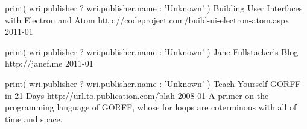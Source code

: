 


\begin{cventries}

  \cventry
    {
    print( wri.publisher ? wri.publisher.name : 'Unknown' )
    } %
    {Building User Interfaces with Electron and Atom} %
    {http://codeproject.com/build-ui-electron-atom.aspx} %
    {2011-01} %
    {} %


  \cventry
    {
    print( wri.publisher ? wri.publisher.name : 'Unknown' )
    } %
    {Jane Fullstacker's Blog} %
    {http://janef.me} %
    {2011-01} %
    {} %


  \cventry
    {
    print( wri.publisher ? wri.publisher.name : 'Unknown' )
    } %
    {Teach Yourself GORFF in 21 Days} %
    {http://url.to.publication.com/blah} %
    {2008-01} %
    {A primer on the programming language of GORFF, whose for loops are coterminous with all of time and space.} %


\end{cventries}

